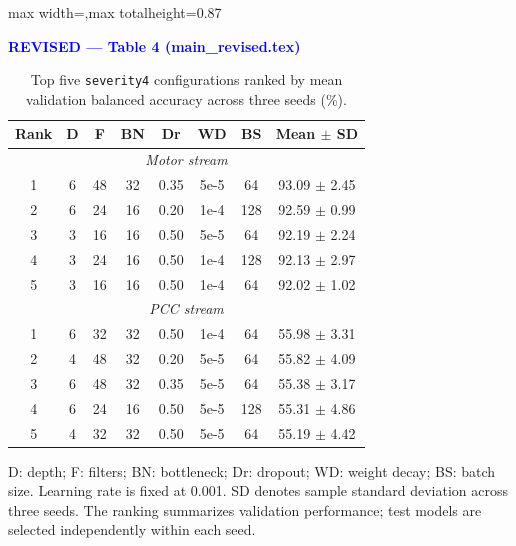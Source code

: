\documentclass[letterpaper,journal]{IEEEtran}
\begin{document}
\begin{table}[p]
\begin{adjustbox}{max width=\textwidth,max totalheight=0.87\textheight}
\begin{minipage}{\textwidth}
\begin{minipage}[t]{0.48\textwidth}
\end{minipage}\hfill%
\begin{minipage}[t]{0.48\textwidth}
\centering
\textcolor{blue}{\textbf{REVISED --- Table 4 (main\_revised.tex)}}\par\smallskip

\centering
\footnotesize
\caption{Top five \texttt{severity4} configurations
ranked by mean validation balanced accuracy
across three seeds (\%).}
\label{tab:search_top5_combined}
\renewcommand{\arraystretch}{1.10}
\setlength{\tabcolsep}{3pt}

\begin{tabular}{@{}cccccccc@{}}
\hline
Rank & D & F & BN & Dr & WD & BS &
Mean $\pm$ SD \\
\hline
\multicolumn{8}{c}{\textit{Motor stream}} \\
\hline
1 & 6 & 48 & 32 & 0.35 & 5e-5 &
64 & 93.09 $\pm$ 2.45 \\
2 & 6 & 24 & 16 & 0.20 & 1e-4 &
128 & 92.59 $\pm$ 0.99 \\
3 & 3 & 16 & 16 & 0.50 & 5e-5 &
64 & 92.19 $\pm$ 2.24 \\
4 & 3 & 24 & 16 & 0.50 & 1e-4 &
128 & 92.13 $\pm$ 2.97 \\
5 & 3 & 16 & 16 & 0.50 & 1e-4 &
64 & 92.02 $\pm$ 1.02 \\
\hline
\multicolumn{8}{c}{\textit{PCC stream}} \\
\hline
1 & 6 & 32 & 32 & 0.50 & 1e-4 &
64 & 55.98 $\pm$ 3.31 \\
2 & 4 & 48 & 32 & 0.20 & 5e-5 &
64 & 55.82 $\pm$ 4.09 \\
3 & 6 & 48 & 32 & 0.35 & 5e-5 &
64 & 55.38 $\pm$ 3.17 \\
4 & 6 & 24 & 16 & 0.50 & 5e-5 &
128 & 55.31 $\pm$ 4.86 \\
5 & 4 & 32 & 32 & 0.50 & 5e-5 &
64 & 55.19 $\pm$ 4.42 \\
\hline
\end{tabular}

\par\smallskip
\begin{minipage}{\columnwidth}
\scriptsize
D: depth; F: filters; BN: bottleneck;
Dr: dropout; WD: weight decay;
BS: batch size. Learning rate is fixed
at 0.001. SD denotes sample standard
deviation across three seeds.
The ranking summarizes validation performance;
test models are selected independently
within each seed.
\end{minipage}

\end{minipage}
\end{minipage}
\end{adjustbox}
\end{table}
\end{document}
